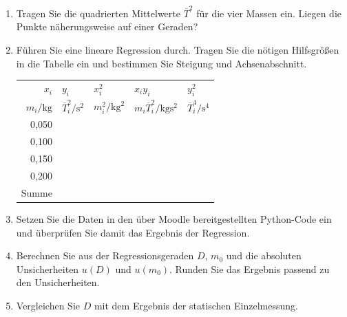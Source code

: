 \begin{ExerciseBlock}
\begin{enumerate}
\item Tragen Sie die quadrierten Mittelwerte $\overline T^2$ für die vier Massen ein. Liegen die Punkte näherungsweise auf einer Geraden?
\begin{center}
\end{center}
\item Führen Sie eine lineare Regression durch. Tragen Sie die nötigen Hilfsgrößen in die Tabelle ein und bestimmen Sie Steigung und Achsenabschnitt.
\begin{center}
\renewcommand{\arraystretch}{1.5}
\begin{tabular}{r|p{18mm}|p{15mm}|p{25mm}|p{18mm}}
\toprule
$x_i$ & $y_i$ & $x_i^2$ & $x_iy_i$ & $y_i^2$\\
$m_i/\unit{\kilogram}$ & $\overline T_i^2/\unit{\second\squared}$ & $m_i^2/\unit{\kilogram\squared}$ & $m_i\overline T_i^2/\unit{\kilogram\second\squared}$ & $\overline T_i^4/\unit{\second\tothe{4}}$\\
\midrule
0,050 & & & & \\\hline
0,100 & & & & \\\hline
0,150 & & & & \\\hline
0,200 & & & & \\\hline
Summe & & & & \\
\bottomrule
\end{tabular}
\end{center}
\item Setzen Sie die Daten in den über Moodle bereitgestellten Python-Code ein und überprüfen Sie damit das Ergebnis der Regression.
\item Berechnen Sie aus der Regressionsgeraden $D$, $m_0$ und die absoluten Unsicherheiten $u(D)$ und $u(m_0)$. Runden Sie das Ergebnis passend zu den Unsicherheiten.
\item Vergleichen Sie $D$ mit dem Ergebnis der statischen Einzelmessung.
\end{enumerate}
\end{ExerciseBlock}
